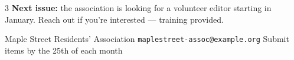 \documentclass[9pt]{extarticle}
\begin{document}
\begin{multicols}{3}
\medskip
\textbf{Next issue:} the association is looking for a volunteer editor
starting in January. Reach out if you're interested --- training provided.

\end{multicols}

\vspace{4pt}
\noindent{\color{banner}\rule{\linewidth}{0.8pt}}

\begin{center}
  \small
  Maple Street Residents' Association \quad\textbullet\quad
  \texttt{maplestreet-assoc@example.org} \quad\textbullet\quad
  Submit items by the 25th of each month
\end{center}
\end{document}
